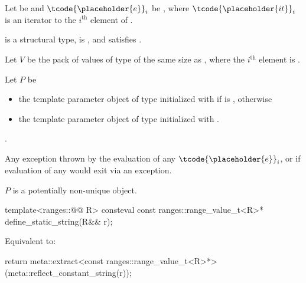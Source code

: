 \begin{itemdescr}
\pnum
Let  be  and
$\tcode{\placeholder{e}}_i$ be ,
where $\tcode{\placeholder{it}}_i$ is an iterator to the $i^\text{th}$ element of .

\pnum
\mandates
{} is a structural type,
 is , and
 satisfies .

\pnum
Let $V$ be the pack of values of type 
of the same size as ,
where the $i^\text{th}$ element is
.

\pnum
Let $P$ be
\begin{itemize}
\item
  the template parameter object
  of type 
  initialized with\linebreak
   if  is , otherwise
\item
  the template parameter object of type 
  initialized with \tcode{\{\}}.
\end{itemize}

\pnum
\returns
{}.

\pnum
\throws
Any exception thrown by the evaluation of any $\tcode{\placeholder{e}}_i$, or
if evaluation of any 
would exit via an exception.

\pnum
\begin{note}
$P$ is a potentially non-unique object.
\end{note}
\end{itemdescr}

%
\begin{itemdecl}
template<ranges::@@ R>
  consteval const ranges::range_value_t<R>* define_static_string(R&& r);
\end{itemdecl}

\begin{itemdescr}
\pnum
\effects
Equivalent to:
\begin{codeblock}
return meta::extract<const ranges::range_value_t<R>*>(meta::reflect_constant_string(r));
\end{codeblock}
\end{itemdescr}

